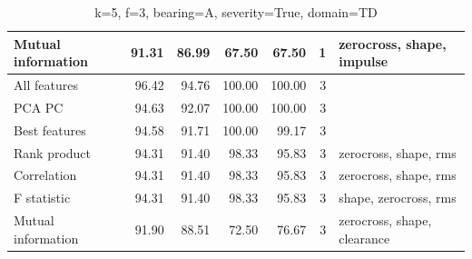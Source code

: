 \begin{table}[h]
\begin{adjustbox}{width=\textwidth}
\begin{tabular}{|l|rr|rr|r|l|}
Mutual information                    & \multicolumn{1}{r|}{91.31}          & 86.99                              & \multicolumn{1}{r|}{67.50}          & 67.50                              & 1                                                   & zerocross, shape, impulse               \\ \hline
All features                          & \multicolumn{1}{r|}{96.42}          & 94.76                              & \multicolumn{1}{r|}{100.00}         & 100.00                             & 3                                                   &                                         \\ \hline
PCA PC                                & \multicolumn{1}{r|}{94.63}          & 92.07                              & \multicolumn{1}{r|}{100.00}         & 100.00                             & 3                                                   &                                         \\ \hline
Best features                         & \multicolumn{1}{r|}{94.58}          & 91.71                              & \multicolumn{1}{r|}{100.00}         & 99.17                              & 3                                                   &                                         \\ \hline
Rank product                          & \multicolumn{1}{r|}{94.31}          & 91.40                              & \multicolumn{1}{r|}{98.33}          & 95.83                              & 3                                                   & zerocross, shape, rms                   \\ \hline
Correlation                           & \multicolumn{1}{r|}{94.31}          & 91.40                              & \multicolumn{1}{r|}{98.33}          & 95.83                              & 3                                                   & zerocross, shape, rms                   \\ \hline
F statistic                           & \multicolumn{1}{r|}{94.31}          & 91.40                              & \multicolumn{1}{r|}{98.33}          & 95.83                              & 3                                                   & shape, zerocross, rms                   \\ \hline
Mutual information                    & \multicolumn{1}{r|}{91.90}          & 88.51                              & \multicolumn{1}{r|}{72.50}          & 76.67                              & 3                                                   & zerocross, shape, clearance             \\ \hline
\end{tabular}
\end{adjustbox}
\caption{k=5, f=3, bearing=A, severity=True, domain=TD}
\end{table}


